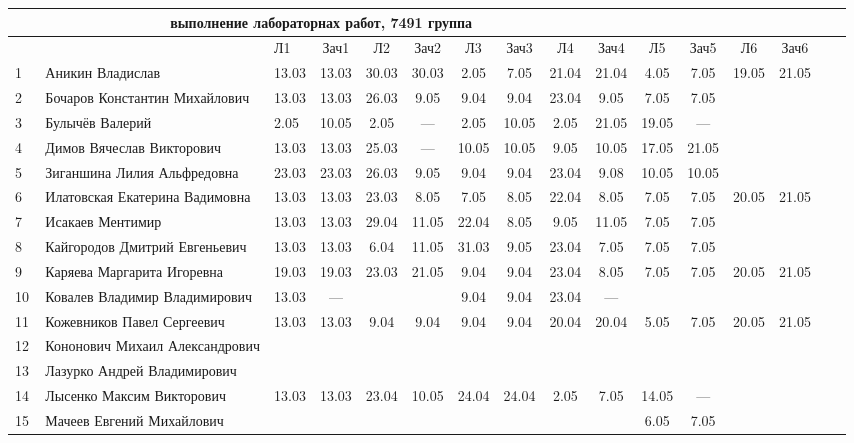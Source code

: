 \documentclass[a4paper,11pt]{article}
\begin{document}
\newpage
{}
\recalctypearea
\hspace{-6.1cm} %
\begin{tabular}{l|llccccccccccccc}
\multicolumn{10}{c}{выполнение лабораторнах работ, 7491 группа} \\
\toprule
&&Л1&Зач1& Л2&Зач2& Л3&Зач3& Л4&Зач4&  Л5&Зач5& Л6&Зач6&\\
\midrule
1\,&Аникин Владислав                &13.03&13.03 &30.03&30.03& 2.05& 7.05&21.04&21.04& 4.05& 7.05 &19.05&21.05\\
2\,&Бочаров Константин Михайлович   &13.03&13.03 &26.03& 9.05& 9.04& 9.04&23.04& 9.05& 7.05& 7.05\\
3\,&Булычёв Валерий                 & 2.05&10.05 & 2.05& --- & 2.05&10.05& 2.05&21.05&19.05& ---\\
4\,&Димов Вячеслав Викторович       &13.03&13.03 &25.03& --- &10.05&10.05& 9.05&10.05&17.05&21.05\\
5\,&Зиганшина Лилия Альфредовна     &23.03&23.03 &26.03& 9.05& 9.04& 9.04&23.04& 9.08&10.05&10.05\\
\midrule
6\,&Илатовская Екатерина Вадимовна  &13.03&13.03 &23.03& 8.05& 7.05& 8.05&22.04& 8.05& 7.05& 7.05&20.05&21.05\\
7\,&Исакаев Ментимир                &13.03&13.03 &29.04&11.05&22.04& 8.05& 9.05&11.05& 7.05& 7.05\\
8\,&Кайгородов Дмитрий Евгеньевич   &13.03&13.03 & 6.04&11.05&31.03& 9.05&23.04& 7.05& 7.05& 7.05\\
9\,&Каряева Маргарита Игоревна      &19.03&19.03 &23.03&21.05& 9.04& 9.04&23.04& 8.05& 7.05& 7.05&20.05&21.05\\
10\,&Ковалев Владимир Владимирович  &13.03& ---  &     &     & 9.04& 9.04&23.04& --- & &\\
\midrule
11\,&Кожевников Павел Сергеевич     &13.03&13.03 & 9.04& 9.04& 9.04& 9.04&20.04&20.04& 5.05& 7.05&20.05&21.05\\
12\,&Кононович Михаил Александрович &     &      &     &     &     &     &     &\\
13\,&Лазурко Андрей Владимирович    &     &      &     &     &     &     &     &\\
14\,&Лысенко Максим Викторович      &13.03&13.03 &23.04&10.05&24.04&24.04& 2.05& 7.05&14.05& --- \\
15\,&Мачеев Евгений Михайлович      &     &      &     &     &     &     &     &     & 6.05& 7.05\\

\end{tabular}
\end{document}
